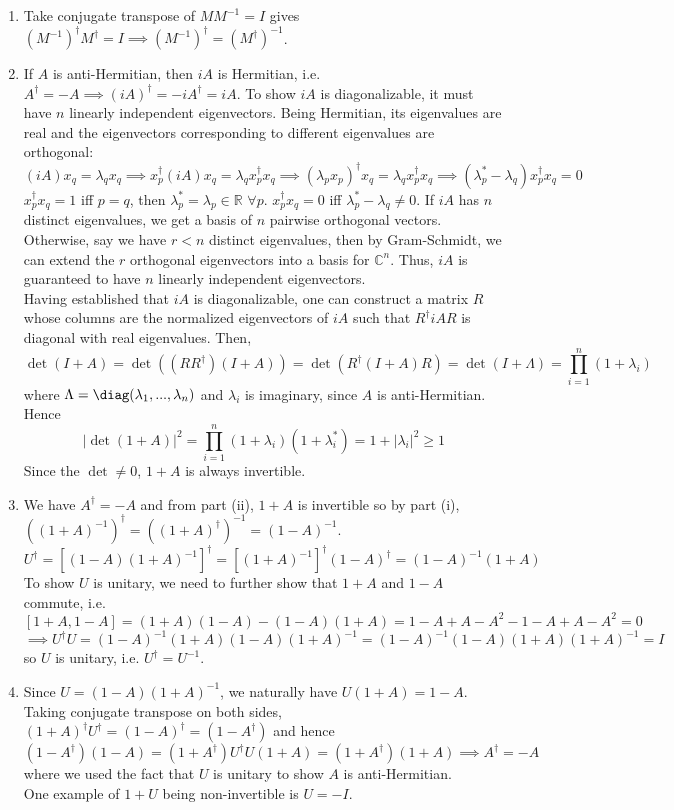 \documentclass[a4paper]{article}
\begin{document}
\begin{ans}\leavevmode
\begin{enumerate}[label=(\roman*)]
\item Take conjugate transpose of $MM^{-1}=I$ gives $(M^{-1})^\dag M^\dag=I\implies (M^{-1})^\dag=(M^\dag)^{-1}$.
\item If $A$ is anti-Hermitian, then $iA$ is Hermitian, i.e. $A^\dag=-A\implies(iA)^\dag=-iA^\dag=iA$. To show $iA$ is diagonalizable, it must have $n$ linearly independent eigenvectors. Being Hermitian, its eigenvalues are real and the eigenvectors corresponding to different eigenvalues are orthogonal: 
$$(iA)x_q=\lambda_qx_q\implies x_p^\dag(iA)x_q=\lambda_qx_p^\dag x_q\implies(\lambda_p x_p)^\dag x_q=\lambda_qx_p^\dag x_q\implies(\lambda_p^*-\lambda_q)x_p^\dag x_q=0$$
$x_p^\dag x_q=1$ iff $p=q$, then $\lambda_p^*=\lambda_p\in\mathbb{R}$ $\forall p$. $x_p^\dag x_q=0$ iff $\lambda_p^*-\lambda_q\neq0$. If $iA$ has $n$ distinct eigenvalues, we get a basis of $n$ pairwise orthogonal vectors. Otherwise, say we have $r<n$ distinct eigenvalues, then by Gram-Schmidt, we can extend the $r$ orthogonal eigenvectors into a basis for $\mathbb{C}^n$. Thus, $iA$ is guaranteed to have $n$ linearly independent eigenvectors.\\[5pt]
Having established that $iA$ is diagonalizable, one can construct a matrix $R$ whose columns are the normalized eigenvectors of $iA$ such that $R^\dag iAR$ is diagonal with real eigenvalues. Then,
$$\det(I+A)=\det((RR^\dag)(I+A))=\det(R^\dag(I+A)R)=\det(I+\Lambda)=\prod_{i=1}^n(1+\lambda_i)$$
where $\Lambda=\diag(\lambda_1,...,\lambda_n)$ and $\lambda_i$ is imaginary, since $A$ is anti-Hermitian. Hence
$$|\det(1+A)|^2=\prod_{i=1}^n(1+\lambda_i)(1+\lambda_i^*)=1+|\lambda_i|^2\geq1$$
Since the $\det\neq0$, $1+A$ is always invertible.
\item We have $A^\dag=-A$ and from part (ii), $1+A$ is invertible so by part (i), $((1+A)^{-1})^\dag=((1+A)^\dag)^{-1}=(1-A)^{-1}$.
$$U^\dag=[(1-A)(1+A)^{-1}]^\dag=[(1+A)^{-1}]^\dag(1-A)^\dag=(1-A)^{-1}(1+A)$$
To show $U$ is unitary, we need to further show that $1+A$ and $1-A$ commute, i.e.
$$[1+A,1-A]=(1+A)(1-A)-(1-A)(1+A)=1-A+A-A^2-1-A+A-A^2=0$$
$$\implies U^\dag U=(1-A)^{-1}(1+A)(1-A)(1+A)^{-1}=(1-A)^{-1}(1-A)(1+A)(1+A)^{-1}=I$$
so $U$ is unitary, i.e. $U^\dag=U^{-1}$.
\item Since $U=(1-A)(1+A)^{-1}$, we naturally have $U(1+A)=1-A$. Taking conjugate transpose on both sides, $(1+A)^\dag U^\dag=(1-A)^\dag=(1-A^\dag)$ and hence
$$(1-A^\dag)(1-A)=(1+A^\dag)U^\dag U(1+A)=(1+A^\dag)(1+A)\implies A^\dag=-A$$
where we used the fact that $U$ is unitary to show $A$ is anti-Hermitian.\\[5pt]
One example of $1+U$ being non-invertible is $U=-I$.
\end{enumerate}
\end{ans}
\end{document}
